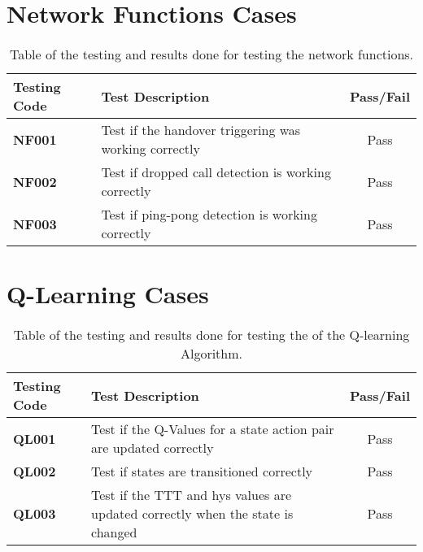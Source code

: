 \section{Network Functions Cases}
\begin{table}[H]
  \begin{center}
    \begin{tabular}{| l | p{8cm} | c |}
  	  \hline
      \textbf{Testing Code} & \textbf{Test Description} & \textbf{Pass/Fail} \\ \hline
      \textbf{NF001} & Test if the handover triggering was working correctly & Pass \\ \hline
      \textbf{NF002} & Test if dropped call detection is working correctly & Pass \\ \hline
   	  \textbf{NF003} & Test if ping-pong detection is working correctly & Pass \\ \hline
  	\end{tabular}
  \end{center}
  \caption{Table of the testing and results done for testing the network functions.}
  \label{tab:test_network}
\end{table}

\section{Q-Learning Cases}
\begin{table}[H]
  \begin{center}
    \begin{tabular}{| l | p{8cm} | c |}
  	  \hline
      \textbf{Testing Code} & \textbf{Test Description} & \textbf{Pass/Fail} \\ \hline
      \textbf{QL001} & Test if the Q-Values for a state action pair are updated correctly & Pass \\ \hline
      \textbf{QL002} & Test if states are transitioned correctly & Pass \\ \hline
   	  \textbf{QL003} & Test if the TTT and hys values are updated correctly when the state is changed & Pass \\ \hline
  	\end{tabular}
  \end{center}
  \caption{Table of the testing and results done for testing the of the Q-learning Algorithm.}
  \label{tab:test_qlearning}
\end{table}
